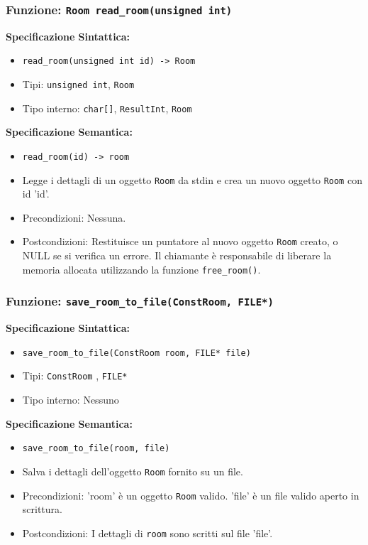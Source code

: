 \documentclass[11pt]{scrartcl} %
\begin{document}
\subsubsection{Funzione: \texttt{Room read\_room(unsigned int)}}

\textbf{Specificazione Sintattica:}
\begin{itemize}
	\item \texttt{read\_room(unsigned int id) -> Room}
	\item Tipi: \texttt{unsigned int}, \texttt{Room}
	\item Tipo interno: \texttt{char[]}, \texttt{ResultInt}, \texttt{Room}
\end{itemize}

\textbf{Specificazione Semantica:}
\begin{itemize}
	\item \texttt{read\_room(id) -> room}
	\item Legge i dettagli di un oggetto \texttt{Room} da stdin e crea un nuovo oggetto \texttt{Room} con id 'id'.
	\item Precondizioni: Nessuna.
	\item Postcondizioni: Restituisce un puntatore al nuovo oggetto \texttt{Room} creato, o NULL se si verifica un errore. Il chiamante è responsabile di liberare la memoria allocata utilizzando la funzione \texttt{free\_room()}.
\end{itemize}

\subsubsection{Funzione: \texttt{save\_room\_to\_file(ConstRoom, FILE*)}}

\textbf{Specificazione Sintattica:}
\begin{itemize}
	\item \texttt{save\_room\_to\_file(ConstRoom room, FILE* file)}
	\item Tipi: \texttt{ConstRoom} , \texttt{FILE*}
	\item Tipo interno: Nessuno
\end{itemize}

\textbf{Specificazione Semantica:}
\begin{itemize}
	\item \texttt{save\_room\_to\_file(room, file)}
	\item Salva i dettagli dell'oggetto \texttt{Room} fornito su un file.
	\item Precondizioni: 'room' è un oggetto \texttt{Room} valido. 'file' è un file valido aperto in scrittura.
	\item Postcondizioni: I dettagli di \texttt{room} sono scritti sul file 'file'.
\end{itemize}
\end{document}
